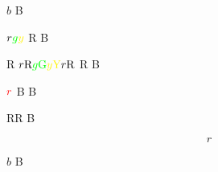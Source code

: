 \documentclass{article}
\begin{document}
$b$ B

{\color{red} $r {\color{green} g \color{yellow} y}$ R} B

{\color{red} R $r \mbox{R} {\color{green} g \mbox{G} \color{yellow} y \mbox{Y}} r \mbox{R}$ R} B

{$\color{red} r$ B} B

{\color{red}$\mbox{R} \text{R}$} B

{\color{red}$$ r $$}

$b$ B
\end{document}
